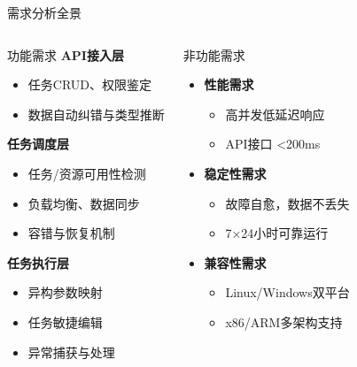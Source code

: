 \documentclass[aspectratio=169,UTF8,xcolor=table]{ctexbeamer}
\begin{document}
\begin{frame}{需求分析全景}
  \begin{columns}[T]
    \begin{block}{功能需求}
      \textbf{API接入层}
      \begin{itemize}
        \item 任务CRUD、权限鉴定
        \item 数据自动纠错与类型推断
      \end{itemize}
      \textbf{任务调度层}
      \begin{itemize}
        \item 任务/资源可用性检测
        \item 负载均衡、数据同步
        \item 容错与恢复机制
      \end{itemize}
      \textbf{任务执行层}
      \begin{itemize}
        \item 异构参数映射
        \item 任务敏捷编辑
        \item 异常捕获与处理
      \end{itemize}
    \end{block}

    \begin{block}{非功能需求}
      \begin{itemize}
        \item \textbf{性能需求}
        \begin{itemize}
          \item 高并发低延迟响应
          \item API接口 <200ms
        \end{itemize}
        \item \textbf{稳定性需求}
        \begin{itemize}
          \item 故障自愈，数据不丢失
          \item 7×24小时可靠运行
        \end{itemize}
        \item \textbf{兼容性需求}
        \begin{itemize}
          \item Linux/Windows双平台
          \item x86/ARM多架构支持
        \end{itemize}
      \end{itemize}
    \end{block}
  \end{columns}
\end{frame}
\end{document}

